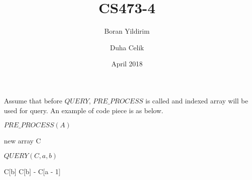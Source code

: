 \documentclass{article}
\title{CS473-4}
\author{Boran Yildirim \and Duha Celik}
\date{April 2018}
\begin{document}
\maketitle

\section{}

Assume that before {$QUERY$}, {$PRE\_PROCESS$} is called and indexed array will be used for query. An example of code piece is as below. \\
\newline
\begin{algorithmic}
\STATE
\STATE
\end{algorithmic}

{$PRE\_PROCESS (A)$}

\begin{algorithmic}
 new array
\ENDFOR
{}
\ENDFOR
{}
\ENDFOR
\RETURN C
\STATE
\STATE
\end{algorithmic}

{$QUERY (C, a, b)$}

\begin{algorithmic}
    \RETURN C[b]
\ELSE
    \RETURN C[b] - C[a - 1]
\ENDIF
\end{algorithmic}

\newpage

\section{}
\end{document}
